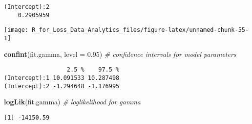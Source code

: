 \documentclass[]{book}
\newenvironment{Shaded}{\begin{snugshade}}{\end{snugshade}}
\newcommand{\KeywordTok}[1]{\textcolor[rgb]{0.13,0.29,0.53}{\textbf{#1}}}
\newcommand{\DataTypeTok}[1]{\textcolor[rgb]{0.13,0.29,0.53}{#1}}
\newcommand{\DecValTok}[1]{\textcolor[rgb]{0.00,0.00,0.81}{#1}}
\newcommand{\FloatTok}[1]{\textcolor[rgb]{0.00,0.00,0.81}{#1}}
\newcommand{\StringTok}[1]{\textcolor[rgb]{0.31,0.60,0.02}{#1}}
\newcommand{\CommentTok}[1]{\textcolor[rgb]{0.56,0.35,0.01}{\textit{#1}}}
\newcommand{\OperatorTok}[1]{\textcolor[rgb]{0.81,0.36,0.00}{\textbf{#1}}}
\newcommand{\NormalTok}[1]{#1}
\theoremstyle{definition}
\theoremstyle{definition}
\theoremstyle{definition}
\theoremstyle{remark}
\begin{document}
\begin{verbatim}
(Intercept):2 
    0.2905959 
\end{verbatim}

\begin{Shaded}
\end{Shaded}

\begin{center}\texttt{[image: R\_for\_Loss\_Data\_Analytics\_files/figure-latex/unnamed-chunk-55-1]} \end{center}

\begin{Shaded}
\begin{Highlighting}[]
\KeywordTok{confint}\NormalTok{(fit.gamma, }\DataTypeTok{level =} \FloatTok{0.95}\NormalTok{)  }\CommentTok{# confidence intervals for model parameters }
\end{Highlighting}
\end{Shaded}

\begin{verbatim}
                  2.5 %    97.5 %
(Intercept):1 10.091533 10.287498
(Intercept):2 -1.294648 -1.176995
\end{verbatim}

\begin{Shaded}
\begin{Highlighting}[]
\KeywordTok{logLik}\NormalTok{(fit.gamma)                 }\CommentTok{# loglikelihood for gamma}
\end{Highlighting}
\end{Shaded}

\begin{verbatim}
[1] -14150.59
\end{verbatim}
\end{document}
